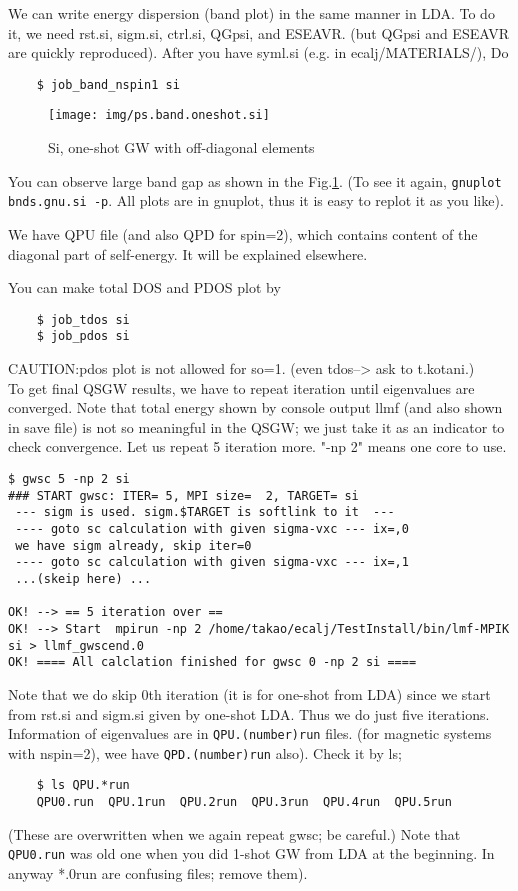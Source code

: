 \documentclass[a4paper,10pt,epsf,fleqn]{article}
\begin{document}
We can write energy dispersion (band plot) in the same manner in LDA.
To do it, we need rst.si, sigm.si, ctrl.si, QGpsi, and ESEAVR.
(but QGpsi and ESEAVR are quickly reproduced). After you have syml.si
(e.g. in ecalj/MATERIALS/), Do
\begin{verbatim}
    $ job_band_nspin1 si
\end{verbatim}

\begin{figure}[h]
 \begin{center}
  \texttt{[image: img/ps.band.oneshot.si]}
  \caption{Si, one-shot GW with off-diagonal elements}
 \end{center}
\label{sigwscone}
\end{figure}
You can observe large band gap as shown in the Fig.\ref{sigwscone}.
(To see it again, \verb+gnuplot bnds.gnu.si -p+.
All plots are in gnuplot, thus it is easy to replot it as you like).

We have QPU file (and also QPD for spin=2), which contains content
of the diagonal part of self-energy. It will be explained elsewhere.

You can make total DOS and PDOS plot by 
\begin{verbatim}
    $ job_tdos si
    $ job_pdos si
\end{verbatim}
CAUTION:pdos plot is not allowed for so=1. (even tdos--> ask to t.kotani.)\\

To get final QSGW results, we have to repeat iteration 
until eigenvalues are converged.
Note that total energy shown by console output llmf (and also shown in
save file) is not so meaningful in the QSGW; we just take it as an indicator to check convergence. 
Let us repeat 5 iteration more. "-np 2" means one core to use.
\begin{verbatim}
$ gwsc 5 -np 2 si
### START gwsc: ITER= 5, MPI size=  2, TARGET= si
 --- sigm is used. sigm.$TARGET is softlink to it  ---
 ---- goto sc calculation with given sigma-vxc --- ix=,0
 we have sigm already, skip iter=0
 ---- goto sc calculation with given sigma-vxc --- ix=,1
 ...(skeip here) ...

OK! --> == 5 iteration over ==
OK! --> Start  mpirun -np 2 /home/takao/ecalj/TestInstall/bin/lmf-MPIK  si > llmf_gwscend.0 
OK! ==== All calclation finished for gwsc 0 -np 2 si ====
\end{verbatim}
Note that we do skip 0th iteration (it is for one-shot from LDA) since
we start from rst.si and sigm.si given by one-shot LDA.
Thus we do just five iterations.
Information of eigenvalues are in \verb+QPU.(number)run+ files.
(for magnetic systems with nspin=2), wee have \verb+QPD.(number)run+ also).
Check it by ls;
\begin{verbatim}
    $ ls QPU.*run
    QPU0.run  QPU.1run  QPU.2run  QPU.3run  QPU.4run  QPU.5run
\end{verbatim}
(These are overwritten when we again repeat gwsc; be careful.)
Note that \verb+QPU0.run+ was old one when you did 1-shot GW from LDA 
at the beginning. In anyway *.0run are confusing files; remove them).
\end{document}
